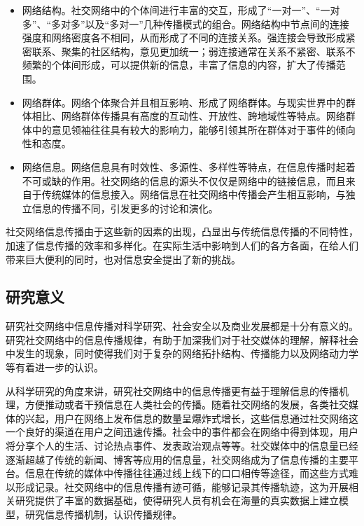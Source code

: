 \begin{itemize}
	\item 网络结构。社交网络中的个体间进行丰富的交互，形成了“一对一”、“一对多”、“多对多”以及“多对一”几种传播模式的组合。网络结构中节点间的连接强度和网络密度各不相同，从而形成了不同的连接关系。强连接会导致形成紧密联系、聚集的社区结构，意见更加统一；弱连接通常在关系不紧密、联系不频繁的个体间形成，可以提供新的信息，丰富了信息的内容，扩大了传播范围。
	\item 网络群体。网络个体聚合并且相互影响、形成了网络群体。与现实世界中的群体相比、网络群体传播具有高度的互动性、开放性、跨地域性等特点。网络群体中的意见领袖往往具有较大的影响力，能够引领其所在群体对于事件的倾向性和态度。
	\item 网络信息。网络信息具有时效性、多源性、多样性等特点，在信息传播时起着不可或缺的作用。社交网络的信息的源头不仅仅是网络中的链接信息，而且来自于传统媒体的信息接入。网络信息在社交网络中传播会产生相互影响，与独立信息的传播不同，引发更多的讨论和演化。
\end{itemize}

社交网络信息传播由于这些新的因素的出现，凸显出与传统信息传播的不同特性，加速了信息传播的效率和多样化。在实际生活中影响到人们的各方各面，在给人们带来巨大便利的同时，也对信息安全提出了新的挑战。
\subsection{研究意义}
\label{subsec1:researchSignificance}
研究社交网络中信息传播对科学研究、社会安全以及商业发展都是十分有意义的。研究社交网络中的信息传播规律，有助于加深我们对于社交媒体的理解，解释社会中发生的现象，同时使得我们对于复杂的网络拓扑结构、传播能力以及网络动力学等有着进一步的认识。

从科学研究的角度来讲，研究社交网络中的信息传播更有益于理解信息的传播机理，方便推动或者干预信息在人类社会的传播。随着社交网络的发展，各类社交媒体的兴起，用户在网络上发布信息的数量呈爆炸式增长，这些信息通过社交网络这一个良好的渠道在用户之间迅速传播。社会中的事件都会在网络中得到体现，用户将分享个人的生活、讨论热点事件、发表政治观点等等。社交媒体中的信息量已经逐渐超越了传统的新闻、博客等应用的信息量，社交网络成为了信息传播的主要平台。信息在传统的媒体中传播往往通过线上线下的口口相传等途径，而这些方式难以形成记录。社交网络中的信息传播有迹可循，能够记录其传播轨迹，这为开展相关研究提供了丰富的数据基础，使得研究人员有机会在海量的真实数据上建立模型，研究信息传播机制，认识传播规律。

